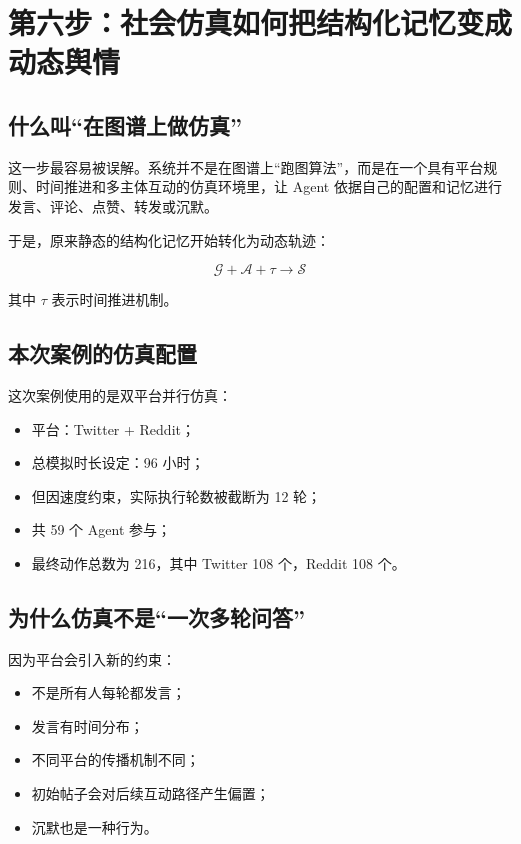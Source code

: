 \documentclass[UTF8,10pt,oneside]{ctexbook}
\begin{document}
\chapter{第六步：社会仿真如何把结构化记忆变成动态舆情}

\section{什么叫“在图谱上做仿真”}

这一步最容易被误解。系统并不是在图谱上“跑图算法”，而是在一个具有平台规则、时间推进和多主体互动的仿真环境里，让 Agent 依据自己的配置和记忆进行发言、评论、点赞、转发或沉默。

于是，原来静态的结构化记忆开始转化为动态轨迹：

\[
\mathcal{G} + \mathcal{A} + \tau \longrightarrow \mathcal{S}
\]

其中 \(\tau\) 表示时间推进机制。

\section{本次案例的仿真配置}

这次案例使用的是双平台并行仿真：

\begin{itemize}
  \item 平台：Twitter + Reddit；
  \item 总模拟时长设定：96 小时；
  \item 但因速度约束，实际执行轮数被截断为 12 轮；
  \item 共 59 个 Agent 参与；
  \item 最终动作总数为 216，其中 Twitter 108 个，Reddit 108 个。
\end{itemize}

\section{为什么仿真不是“一次多轮问答”}

因为平台会引入新的约束：

\begin{itemize}
  \item 不是所有人每轮都发言；
  \item 发言有时间分布；
  \item 不同平台的传播机制不同；
  \item 初始帖子会对后续互动路径产生偏置；
  \item 沉默也是一种行为。
\end{itemize}
\end{document}
